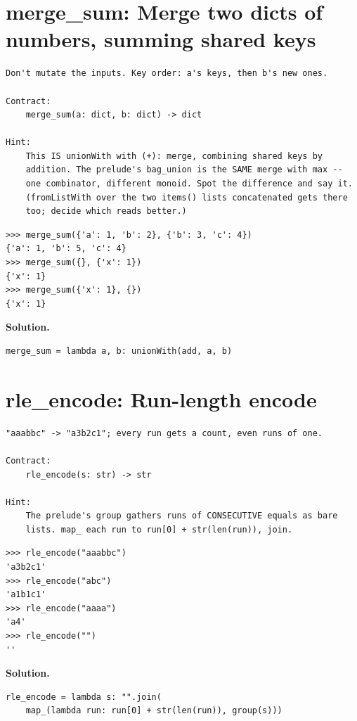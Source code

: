 \documentclass[10pt,letterpaper]{book}
\begin{document}
\section{merge\_sum: Merge two dicts of numbers, summing shared keys}
\begin{lstlisting}[style=ex]
Don't mutate the inputs. Key order: a's keys, then b's new ones.

Contract:
    merge_sum(a: dict, b: dict) -> dict

Hint:
    This IS unionWith with (+): merge, combining shared keys by
    addition. The prelude's bag_union is the SAME merge with max --
    one combinator, different monoid. Spot the difference and say it.
    (fromListWith over the two items() lists concatenated gets there
    too; decide which reads better.)
\end{lstlisting}
\begin{lstlisting}[style=ex]
>>> merge_sum({'a': 1, 'b': 2}, {'b': 3, 'c': 4})
{'a': 1, 'b': 5, 'c': 4}
>>> merge_sum({}, {'x': 1})
{'x': 1}
>>> merge_sum({'x': 1}, {})
{'x': 1}
\end{lstlisting}
\noindent\textbf{Solution.}
\begin{lstlisting}[style=code]
merge_sum = lambda a, b: unionWith(add, a, b)
\end{lstlisting}

\section{rle\_encode: Run-length encode}
\begin{lstlisting}[style=ex]
"aaabbc" -> "a3b2c1"; every run gets a count, even runs of one.

Contract:
    rle_encode(s: str) -> str

Hint:
    The prelude's group gathers runs of CONSECUTIVE equals as bare
    lists. map_ each run to run[0] + str(len(run)), join.
\end{lstlisting}
\begin{lstlisting}[style=ex]
>>> rle_encode("aaabbc")
'a3b2c1'
>>> rle_encode("abc")
'a1b1c1'
>>> rle_encode("aaaa")
'a4'
>>> rle_encode("")
''
\end{lstlisting}
\noindent\textbf{Solution.}
\begin{lstlisting}[style=code]
rle_encode = lambda s: "".join(
    map_(lambda run: run[0] + str(len(run)), group(s)))
\end{lstlisting}
\end{document}
